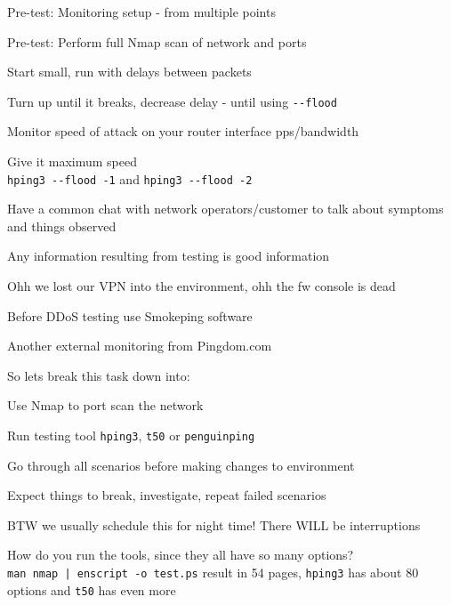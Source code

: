 \documentclass[Screen16to9,17pt]{foils}
\begin{document}
\begin{list2}
\item Pre-test: Monitoring setup - from multiple points
\item Pre-test: Perform full Nmap scan of network and ports
\item Start small, run with delays between packets
\item Turn up until it breaks, decrease delay - until using \verb+--flood+
\item Monitor speed of attack on your router interface pps/bandwidth
\item Give it maximum speed\\
 \verb+hping3 --flood -1+ and \verb+hping3 --flood -2+
\item Have a common chat with network operators/customer to talk about symptoms and things observed
\item Any information resulting from testing is good information
\end{list2}

\vskip 1cm
\centerline{Ohh we lost our VPN into the environment, ohh the fw console is dead}



\centerline{Before DDoS testing  use Smokeping software}



\centerline{Another external monitoring from Pingdom.com}


So lets break this task down into:
\begin{list2}
\item Use Nmap to port scan the network
\item Run testing tool \verb+hping3+, \verb+t50+ or \verb+penguinping+
\item Go through all scenarios before making changes to environment
\item Expect things to break, investigate, repeat failed scenarios
\vskip 1cm
\item BTW we usually schedule this for night time! There WILL be interruptions
\vskip 1cm
\item How do you run the tools, since they all have so many options?\\
\verb+man nmap | enscript -o test.ps+ result in 54 pages,
\verb+hping3+ has about 80 options and \verb+t50+ has even more
\end{list2}
\end{document}
